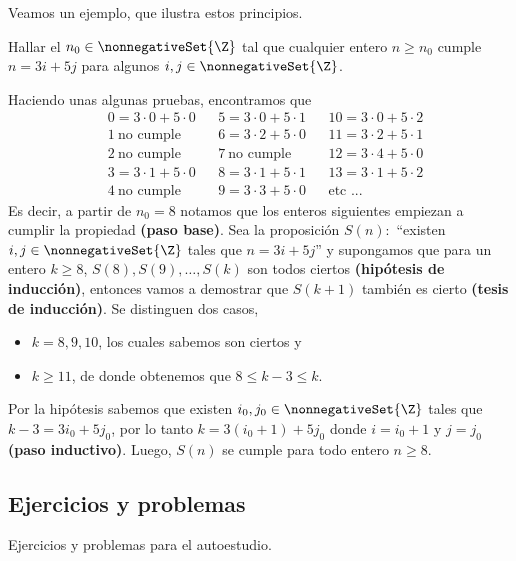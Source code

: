 Veamos un ejemplo, que ilustra estos principios.
\begin{example}
    Hallar el $n_0 \in \nonnegativeSet{\Z}$ tal que cualquier entero $n \geq n_0$ cumple $n = 3i + 5j$ para algunos
    $i,j \in \nonnegativeSet{\Z}$.
\end{example}
\begin{solution}
    Haciendo unas algunas pruebas, encontramos que
    \begin{align*}
        &0 = 3\cdot 0 + 5\cdot 0 && 5 = 3\cdot 0 + 5\cdot 1 && 10 = 3\cdot 0 + 5\cdot 2\\
        &1\ \text{no cumple} && 6 = 3\cdot 2 + 5\cdot 0 && 11 = 3\cdot 2 + 5\cdot 1\\
        &2\ \text{no cumple} && 7\ \text{no cumple} && 12 = 3\cdot 4 + 5\cdot 0\\
        &3 = 3\cdot 1 + 5\cdot 0 && 8 = 3\cdot 1 + 5\cdot 1 && 13 = 3\cdot 1 + 5 \cdot 2\\
        &4\ \text{no cumple} && 9 = 3\cdot 3 + 5\cdot 0 && \text{etc ...}
    \end{align*}
    Es decir, a partir de $n_0 = 8$ notamos que los enteros siguientes empiezan a cumplir la propiedad \textbf{\small(paso base)}.
    Sea la proposición $S(n) : $ ``existen $i,j \in \nonnegativeSet{\Z}$ tales que $n = 3i + 5j$'' y supongamos que
    para un entero $k \geq 8$, $S(8), S(9), \ldots, S(k)$ son todos ciertos \textbf{\small(hipótesis de inducción)},
    entonces vamos a demostrar que $S(k + 1)$ también es cierto \textbf{\small(tesis de inducción)}.
    Se distinguen dos casos,
    \begin{itemize}
        \item $k = 8,9,10$, los cuales sabemos son ciertos y
        \item $k \geq 11$, de donde obtenemos que $8 \leq k - 3 \leq k$.
    \end{itemize}
    Por la hipótesis sabemos que existen $i_0,j_0 \in \nonnegativeSet{\Z}$ tales que $k - 3 = 3 i_0 + 5 j_0$, por lo tanto
    $k = 3 (i_0 + 1) + 5j_0$ donde $i = i_0 + 1$ y $j = j_0$ \textbf{\small(paso inductivo)}.
    Luego, $S(n)$ se cumple para todo entero $n \geq 8$.
\end{solution}


\subsection{Ejercicios y problemas}

Ejercicios y problemas para el autoestudio.

